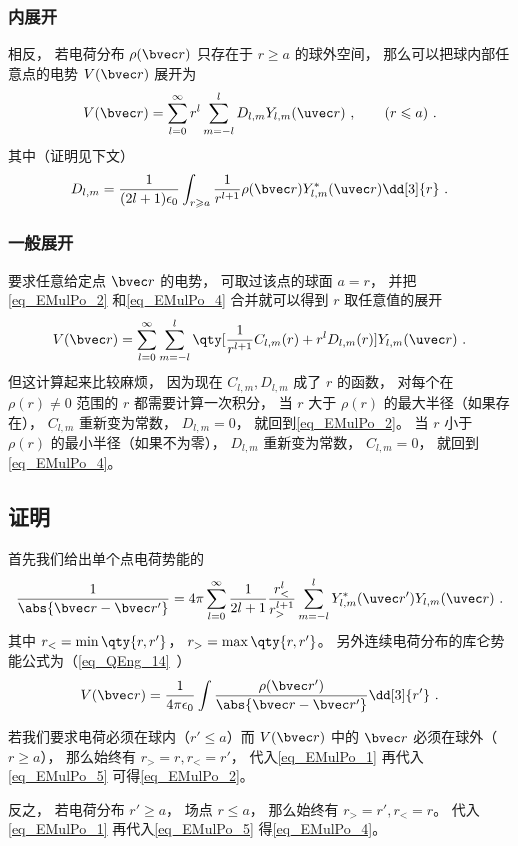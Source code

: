 \subsubsection{内展开}
相反， 若电荷分布 $\rho(\bvec r)$ 只存在于 $r \geqslant a$ 的球外空间， 那么可以把球内部任意点的电势 $V(\bvec r)$ 展开为
\begin{equation}\label{eq_EMulPo_4}
V(\bvec r) = \sum_{l = 0}^\infty r^l \sum_{m = -l}^l D_{l,m} Y_{l,m}(\uvec r)~, \qquad (r \leqslant a)~.
\end{equation}
其中（证明见下文）
\begin{equation}\label{eq_EMulPo_3}
D_{l,m} = \frac{1}{(2l+1)\epsilon_0} \int_{r\geqslant a} \frac{1}{r^{l+1}} \rho(\bvec r) Y_{l,m}^*(\uvec r) \dd[3]{r}~.
\end{equation}

\subsubsection{一般展开}
要求任意给定点 $\bvec r$ 的电势， 可取过该点的球面 $a = r$， 并把\autoref{eq_EMulPo_2} 和\autoref{eq_EMulPo_4} 合并就可以得到 $r$ 取任意值的展开
\begin{equation}
V(\bvec r) = \sum_{l = 0}^\infty\sum_{m = -l}^l \qty[\frac{1}{r^{l+1}} C_{l,m}(r) + r^l D_{l,m}(r)] Y_{l,m}(\uvec r)~.
\end{equation}
但这计算起来比较麻烦， 因为现在 $C_{l,m}, D_{l,m}$ 成了 $r$ 的函数， 对每个在 $\rho(r)\ne 0$ 范围的 $r$ 都需要计算一次积分， 当 $r$ 大于 $\rho(r)$ 的最大半径（如果存在）， $C_{l,m}$ 重新变为常数， $D_{l,m}= 0$， 就回到\autoref{eq_EMulPo_2}。 当 $r$ 小于 $\rho(r)$ 的最小半径（如果不为零）， $D_{l,m}$ 重新变为常数， $C_{l,m} = 0$， 就回到\autoref{eq_EMulPo_4}。

\subsection{证明}
首先我们给出单个点电荷势能的
\begin{equation}\label{eq_EMulPo_1}
\frac{1}{\abs{\bvec r - \bvec r'}} = 4\pi \sum_{l=0}^{\infty} \frac{1}{2l+1} \frac{r_<^l}{r_>^{l+1}} \sum_{m = -l}^l Y_{l,m}^*(\uvec r') Y_{l,m}(\uvec r)~.
\end{equation}
其中 $r_< = \min\qty{r, r'}$， $r_> = \max\qty{r, r'}$。 另外连续电荷分布的库仑势能公式为（\autoref{eq_QEng_14}~）
\begin{equation}\label{eq_EMulPo_5}
V(\bvec r) = \frac{1}{4\pi\epsilon_0}\int \frac{\rho(\bvec r')}{\abs{\bvec r - \bvec r'}} \dd[3]{r'}~.
\end{equation}

若我们要求电荷必须在球内（$r' \leqslant a$）而 $V(\bvec r)$ 中的 $\bvec r$ 必须在球外（$r \geqslant a$）， 那么始终有 $r_> = r, r_< = r'$， 代入\autoref{eq_EMulPo_1} 再代入\autoref{eq_EMulPo_5} 可得\autoref{eq_EMulPo_2}。

反之， 若电荷分布 $r' \geqslant a$， 场点 $r \leqslant a$， 那么始终有 $r_> = r', r_< = r$。 代入\autoref{eq_EMulPo_1} 再代入\autoref{eq_EMulPo_5} 得\autoref{eq_EMulPo_4}。
